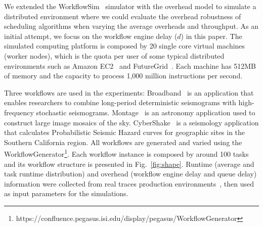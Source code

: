We extended the WorkflowSim~\cite{WorkflowSim} simulator with the overhead model to simulate a distributed environment where we could evaluate the overhead robustness of scheduling algorithms when varying the average overheads and throughput. As an initial attempt, we focus on the workflow engine delay ($d$) in this paper. The simulated computing platform is composed by 20 single core virtual machines (worker nodes), which is the quota per user of some typical distributed environments such as Amazon EC2~\cite{AmazonAWS} and FutureGrid~\cite{FutureGrid}. Each machine has 512MB of memory and the capacity to process 1,000 million instructions per second. 



Three workflows are used in the experiments: 
Broadband~\cite{Broadband} is an application that enables researchers to combine long-period deterministic seismograms with high-frequency stochastic seismograms. 
Montage~\cite{Sakellariou2010} is an astronomy application used to construct large image mosaics of the sky. CyberShake~\cite{Callaghan2008} is a seismology application that calculates Probabilistic Seismic Hazard curves for geographic sites in the Southern California region. All workflows are generated and varied using the WorkflowGenerator\footnote[1]{https://confluence.pegasus.isi.edu/display/pegasus/WorkflowGenerator}. Each workflow instance is composed by around 100 tasks and its workflow structure is presented in Fig.~\ref{fig:shape}. Runtime (average and task runtime distribution) and overhead (workflow engine delay and queue delay) information were collected from real traces production environments~\cite{Chen2011, Juve2013}, then used as input parameters for the simulations.




